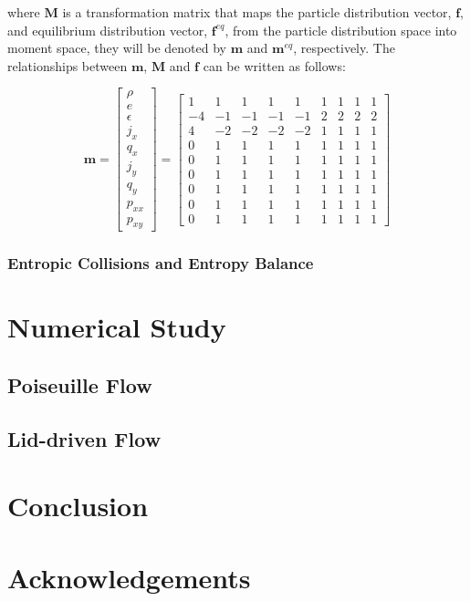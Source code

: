 \documentclass{article}
\newcommand{\transM}{\mathbf{M}}
\begin{document}
\noindent where $\transM$ is a transformation matrix that maps the particle distribution vector, $\mathbf{f}$, and equilibrium distribution vector, $\mathbf{f}^{eq}$, from the particle distribution space into moment space, they will be denoted by $\mathbf{m}$ and $\mathbf{m}^{eq}$, respectively.
The relationships between $\mathbf{m}$, $\transM$ and $\mathbf{f}$ can be written as follows:

\begin{equation}
\mathbf{m} = \begin{bmatrix}
\rho \\ e \\ \epsilon \\ j_x \\ q_x \\ j_y \\ q_y \\ p_{xx} \\ p_{xy}
\end{bmatrix} = \begin{bmatrix}
1 & 1 & 1 & 1 & 1 & 1 & 1 & 1 & 1 \\
-4 & -1 & -1 & -1 & -1 & 2 & 2 & 2 & 2 \\
4 & -2 & -2 & -2 & -2 & 1 & 1 & 1 & 1 \\
0 & 1 & 1 & 1 & 1 & 1 & 1 & 1 & 1 \\
0 & 1 & 1 & 1 & 1 & 1 & 1 & 1 & 1 \\
0 & 1 & 1 & 1 & 1 & 1 & 1 & 1 & 1 \\
0 & 1 & 1 & 1 & 1 & 1 & 1 & 1 & 1 \\
0 & 1 & 1 & 1 & 1 & 1 & 1 & 1 & 1 \\
0 & 1 & 1 & 1 & 1 & 1 & 1 & 1 & 1
\end{bmatrix}
\end{equation}

\subsubsection{Entropic Collisions and Entropy Balance}

\section{Numerical Study}

\subsection{Poiseuille Flow} 

\subsection{Lid-driven Flow}

\section{Conclusion}

\section*{Acknowledgements}



	
\end{document}
